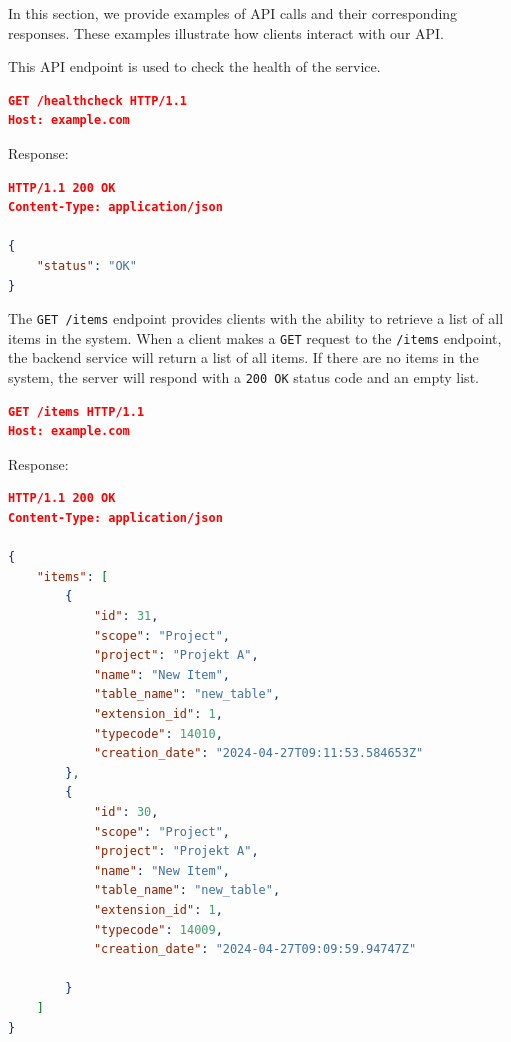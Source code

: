 In this section, we provide examples of API calls and their corresponding responses.
These examples illustrate how clients interact with our API.


This API endpoint is used to check the health of the service.

\begin{lstlisting}[language=json,label={lst:lstlisting6}]
GET /healthcheck HTTP/1.1
Host: example.com
\end{lstlisting}

Response:

\begin{lstlisting}[language=json,label={lst:lstlisting4}]
HTTP/1.1 200 OK
Content-Type: application/json

{
    "status": "OK"
}
\end{lstlisting}


The \texttt{GET /items} endpoint provides clients with the ability to retrieve a list of all items in the system.
When a client makes a \texttt{GET} request to the \texttt{/items} endpoint, the backend service will return a list of all items.
If there are no items in the system, the server will respond with a \texttt{200 OK} status code and an empty list.

\begin{lstlisting}[language=json,label={lst:lstlisting3}]
GET /items HTTP/1.1
Host: example.com
\end{lstlisting}

Response:

\begin{lstlisting}[language=json,label={lst:lstlisting}]
HTTP/1.1 200 OK
Content-Type: application/json

{
    "items": [
        {
            "id": 31,
            "scope": "Project",
            "project": "Projekt A",
            "name": "New Item",
            "table_name": "new_table",
            "extension_id": 1,
            "typecode": 14010,
            "creation_date": "2024-04-27T09:11:53.584653Z"
        },
        {
            "id": 30,
            "scope": "Project",
            "project": "Projekt A",
            "name": "New Item",
            "table_name": "new_table",
            "extension_id": 1,
            "typecode": 14009,
            "creation_date": "2024-04-27T09:09:59.94747Z"

        }
    ]
}
\end{lstlisting}

